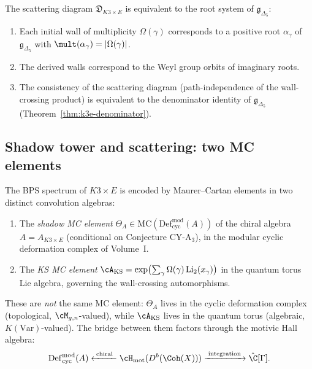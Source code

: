 \begin{theorem}[KS scattering = BKM root system]
\label{thm:k3e-scattering-bkm}
\ClaimStatusProvedElsewhere
The scattering diagram $\mathfrak{D}_{K3 \times E}$ is equivalent to the root system of $\mathfrak{g}_{\Delta_5}$:
\begin{enumerate}[label=(\roman*)]
 \item Each initial wall of multiplicity $\Omega(\gamma)$ corresponds to a positive root $\alpha_\gamma$ of $\mathfrak{g}_{\Delta_5}$ with $\mult(\alpha_\gamma) = |\Omega(\gamma)|$.
 \item The derived walls correspond to the Weyl group orbits of imaginary roots.
 \item The consistency of the scattering diagram (path-independence of the wall-crossing product) is equivalent to the denominator identity of $\mathfrak{g}_{\Delta_5}$ (Theorem~\ref{thm:k3e-denominator}).
\end{enumerate}
\ClaimStatusProvedElsewhere
\end{theorem}

\subsection{Shadow tower and scattering: two MC elements}
\label{subsec:k3e-shadow-scattering}


\begin{conjecture}
\label{conj:k3e-two-mc}
\ClaimStatusConjectured
The BPS spectrum of $K3 \times E$ is encoded by Maurer--Cartan elements in two distinct convolution algebras:
\begin{enumerate}[label=(\roman*)]
 \item The \emph{shadow MC element} $\Theta_A \in \mathrm{MC}(\mathrm{Def}_{\mathrm{cyc}}^{\mathrm{mod}}(A))$ of the chiral algebra $A = A_{K3 \times E}$ (conditional on Conjecture CY-A$_3$), in the modular cyclic deformation complex of Volume~I.
 \item The \emph{KS MC element} $\cA_{\mathrm{KS}} = \exp\bigl(\sum_\gamma \Omega(\gamma) \, \mathrm{Li}_2(x_\gamma)\bigr)$ in the quantum torus Lie algebra, governing the wall-crossing automorphisms.
\end{enumerate}
These are \emph{not} the same MC element: $\Theta_A$ lives in the cyclic deformation complex (topological, $\cM_{g,n}$-valued), while $\cA_{\mathrm{KS}}$ lives in the quantum torus (algebraic, $K(\mathrm{Var})$-valued). The bridge between them factors through the motivic Hall algebra:
\[
 \mathrm{Def}_{\mathrm{cyc}}^{\mathrm{mod}}(A) \xleftarrow{\;\text{chiral}\;} \cH_{\mathrm{mot}}(D^b(\Coh(X))) \xrightarrow{\;\text{integration}\;} \hat{\C}[\Gamma].
\]
\end{conjecture}

